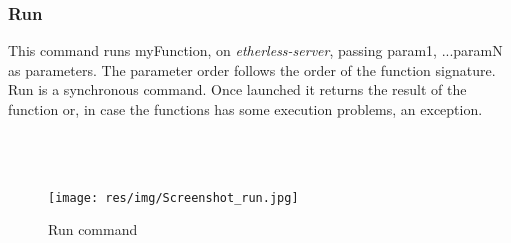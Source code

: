 


\subsubsection{Run}
This command runs myFunction, on \textit{etherless-server}, passing param1, ...paramN as parameters. The parameter order follows the order of the function signature. Run is a synchronous command. Once launched it returns the result of the function or, in case the functions has some execution problems, an exception.\\\\
\centerline{}\\
\begin{figure}
	\centering
	\texttt{[image: res/img/Screenshot\_run.jpg]}
	\caption{Run command}
\end{figure}
\\
\\

